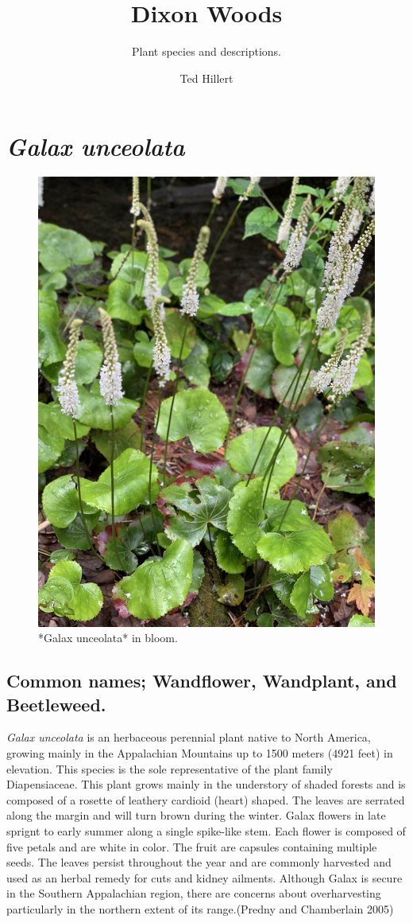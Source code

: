 \documentclass[
]{article}
\title{Dixon Woods}
\subtitle{Plant species and descriptions.}
\author{Ted Hillert}
\date{}
\begin{document}
\maketitle

{
\setcounter{tocdepth}{2}
\tableofcontents
}
\hypertarget{galax-unceolata}{%
\section{\texorpdfstring{\emph{Galax unceolata}}{Galax unceolata}}\label{galax-unceolata}}

\begin{figure}

{\centering \includegraphics[width=0.5\linewidth]{galax1} 

}

\caption{*Galax unceolata* in bloom.}\label{fig:galax1}
\end{figure}

\hypertarget{common-names-wandflower-wandplant-and-beetleweed.}{%
\subsection{Common names; Wandflower, Wandplant, and Beetleweed.}\label{common-names-wandflower-wandplant-and-beetleweed.}}

\emph{Galax unceolata} is an herbaceous perennial plant native to North America, growing mainly in the Appalachian Mountains up to 1500 meters (4921 feet) in elevation. This species is the sole representative of the plant family Diapensiaceae. This plant grows mainly in the understory of shaded forests and is composed of a rosette of leathery cardioid (heart) shaped. The leaves are serrated along the margin and will turn brown during the winter. Galax flowers in late sprignt to early summer along a single spike-like stem. Each flower is composed of five petals and are white in color. The fruit are capsules containing multiple seeds. The leaves persist throughout the year and are commonly harvested and used as an herbal remedy for cuts and kidney ailments. Although Galax is secure in the Southern Appalachian region, there are concerns about overharvesting particularly in the northern extent of its range.(Predny and Chamberlain 2005)
\end{document}
